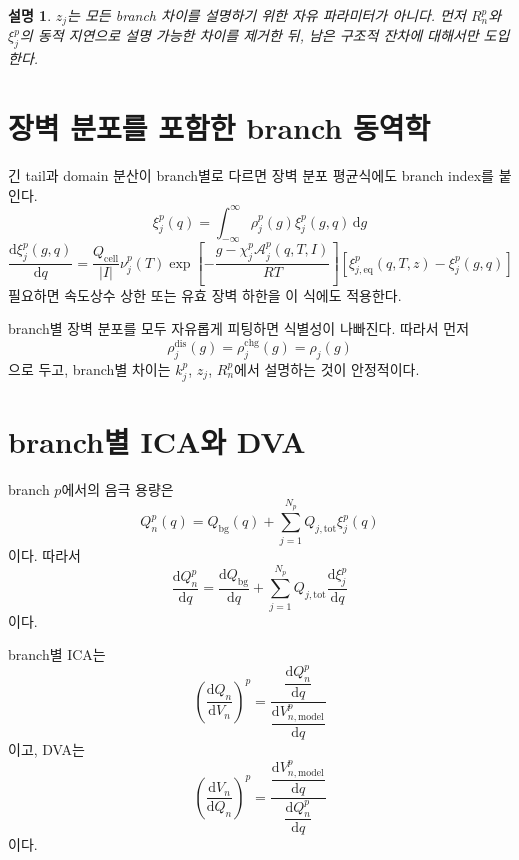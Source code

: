 \documentclass[11pt,a4paper]{article}
\newtheorem*{note}{설명}
\newcommand{\dd}{\mathrm{d}}
\newcommand{\eq}{\mathrm{eq}}
\newcommand{\tot}{\mathrm{tot}}
\newcommand{\bg}{\mathrm{bg}}
\newcommand{\cell}{\mathrm{cell}}
\newcommand{\dis}{\mathrm{dis}}
\newcommand{\chg}{\mathrm{chg}}
\begin{document}
\begin{note}
\(z_j\)는 모든 branch 차이를 설명하기 위한 자유 파라미터가 아니다. 먼저 \(R_n^p\)와 \(\xi_j^p\)의 동적 지연으로 설명 가능한 차이를 제거한 뒤, 남은 구조적 잔차에 대해서만 도입한다.
\end{note}

\section{장벽 분포를 포함한 branch 동역학}
긴 tail과 domain 분산이 branch별로 다르면 장벽 분포 평균식에도 branch index를 붙인다.
\begin{equation}
\xi_j^{p}(q)
=
\int_{-\infty}^{\infty}\rho_j^{p}(g)\xi_j^{p}(g,q)\,\dd g
\label{eq:v5_dist_branch_xi}
\end{equation}
\begin{equation}
\frac{\dd\xi_j^{p}(g,q)}{\dd q}
=
\frac{Q_{\cell}}{|I|}
\nu_j^{p}(T)
\exp\left[-\frac{g-\chi_j^{p}\mathcal A_j^{p}(q,T,I)}{RT}\right]
\left[
\xi_{j,\eq}^{p}(q,T,z)-\xi_j^{p}(g,q)
\right]
\label{eq:v5_dist_branch_ode}
\end{equation}
필요하면 속도상수 상한 또는 유효 장벽 하한을 이 식에도 적용한다.

branch별 장벽 분포를 모두 자유롭게 피팅하면 식별성이 나빠진다. 따라서 먼저
\begin{equation}
\rho_j^{\dis}(g)=\rho_j^{\chg}(g)=\rho_j(g)
\end{equation}
으로 두고, branch별 차이는 \(k_j^p\), \(z_j\), \(R_n^p\)에서 설명하는 것이 안정적이다.

\section{branch별 ICA와 DVA}
branch \(p\)에서의 음극 용량은
\begin{equation}
Q_n^{p}(q)
=
Q_{\bg}(q)+\sum_{j=1}^{N_p}Q_{j,\tot}\xi_j^{p}(q)
\label{eq:v5_Q_branch}
\end{equation}
이다. 따라서
\begin{equation}
\frac{\dd Q_n^{p}}{\dd q}
=
\frac{\dd Q_{\bg}}{\dd q}
+
\sum_{j=1}^{N_p}Q_{j,\tot}\frac{\dd\xi_j^{p}}{\dd q}
\label{eq:v5_dQdq_branch}
\end{equation}
이다.

branch별 ICA는
\begin{equation}
\left(\frac{\dd Q_n}{\dd V_n}\right)^{p}
=
\frac{\dfrac{\dd Q_n^{p}}{\dd q}}
{\dfrac{\dd V_{n,\mathrm{model}}^{p}}{\dd q}}
\label{eq:v5_ica_branch}
\end{equation}
이고, DVA는
\begin{equation}
\left(\frac{\dd V_n}{\dd Q_n}\right)^{p}
=
\frac{\dfrac{\dd V_{n,\mathrm{model}}^{p}}{\dd q}}
{\dfrac{\dd Q_n^{p}}{\dd q}}
\label{eq:v5_dva_branch}
\end{equation}
이다.
\end{document}
